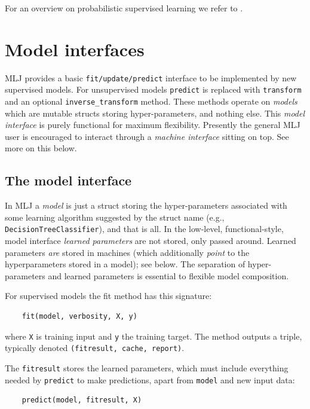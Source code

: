\documentclass{article}
\begin{document}
For an overview on probabilistic supervised learning we refer to \cite{Gressmann2018}.

\section{Model interfaces}

MLJ provides a basic \texttt{fit/update/predict} interface to be implemented by new supervised models. For unsupervised models \texttt{predict} is replaced with \texttt{transform} and an optional \texttt{inverse\_transform} method. These methods operate on \textit{models} which are mutable structs storing hyper-parameters, and nothing else. This \textit{model interface} is purely functional for maximum flexibility. Presently the general MLJ user is encouraged to interact through a \textit{machine interface} sitting on top. See more on this below.

\subsection{The model interface}

In MLJ a \textit{model} is just a struct storing the hyper-parameters associated with some learning algorithm suggested by the struct name (e.g., \texttt{DecisionTreeClassifier}), and that is all. In the low-level, functional-style, model interface \textit{learned parameters} are not stored, only passed around. Learned parameters \textit{are} stored in machines (which additionally \textit{point} to the hyperparameters stored in a model); see below. The separation of hyper-parameters and learned parameters is essential to flexible model composition.

For supervised models the fit method has this signature:

\begin{verbatim}
    fit(model, verbosity, X, y)
\end{verbatim}

where \texttt{X} is training input and \texttt{y} the training target. The method outputs a triple, typically denoted \texttt{(fitresult, cache, report)}.

The \texttt{fitresult} stores the learned parameters, which must include everything needed by \texttt{predict} to make predictions, apart from \texttt{model} and new input data:

\begin{verbatim}
    predict(model, fitresult, X)
\end{verbatim}
\end{document}
